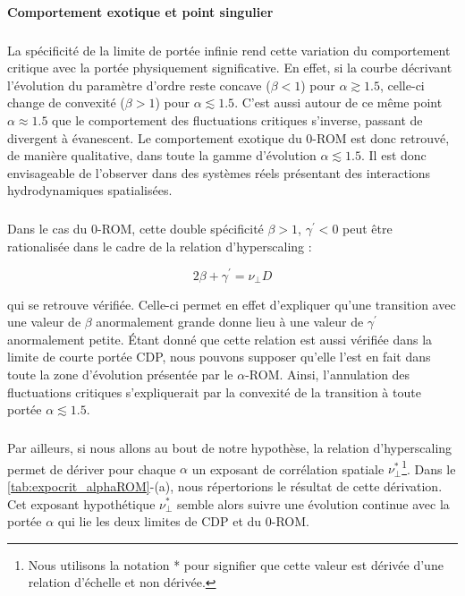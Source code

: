 \paragraph{Comportement exotique et point singulier}

\subparagraph{}La spécificité de la limite de portée infinie rend cette variation du comportement critique avec la portée physiquement significative. En effet, si la courbe décrivant l'évolution du paramètre d'ordre reste concave ($\beta < 1$) pour $\alpha \gtrsim 1.5$, celle-ci change de convexité ($\beta >1$) pour $\alpha \lesssim 1.5$. C'est aussi autour de ce même point $\alpha \approx 1.5$ que le comportement des fluctuations critiques s'inverse, passant de divergent à évanescent. Le comportement exotique du 0-ROM est donc retrouvé, de manière qualitative, dans toute la gamme d'évolution $\alpha \lesssim 1.5$. Il est donc envisageable de l'observer dans des systèmes réels présentant des interactions hydrodynamiques spatialisées.

\subparagraph{}Dans le cas du 0-ROM, cette double spécificité $\beta>1$, $\gamma^\prime<0$ peut être rationalisée dans le cadre de la relation d'hyperscaling \cite{lubeck_universal_2004} \cite{mari_absorbing_2022} :

\begin{equation}
	2\beta + \gamma^\prime = \nu_\perp D
\end{equation}

\noindent qui se retrouve vérifiée. Celle-ci permet en effet d'expliquer qu'une transition avec une valeur de $\beta$ anormalement grande donne lieu à une valeur de $\gamma^\prime$ anormalement petite. Étant donné que cette relation est aussi vérifiée dans la limite de courte portée CDP, nous pouvons supposer qu'elle l'est en fait dans toute la zone d'évolution présentée par le $\alpha$-ROM. Ainsi, l'annulation des fluctuations critiques s'expliquerait par la convexité de la transition à toute portée $\alpha \lesssim 1.5$.

\subparagraph{}Par ailleurs, si nous allons au bout de notre hypothèse, la relation d'hyperscaling permet de dériver pour chaque $\alpha$ un exposant de corrélation spatiale $\nu_\perp^*$\footnote{Nous utilisons la notation * pour signifier que cette valeur est dérivée d'une relation d'échelle et non dérivée.}. Dans le \autoref{tab:expocrit_alphaROM}-(a), nous répertorions le résultat de cette dérivation. Cet exposant hypothétique $\nu_\perp^*$ semble alors suivre une évolution continue avec la portée $\alpha$ qui lie les deux limites de CDP et du 0-ROM.

